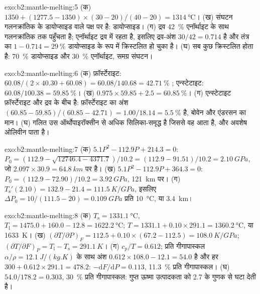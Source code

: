 \begin{solution}{exo:b2:mantle-melting:5}
(क) $1350 + (1277.5 - 1350)\times(30 - 20)/(40 - 20) = \qty{1314}{\celsius}$।
(ख) संघटन गलनक्रांतिक के डायोप्साइड वाले पक्ष पर है: डायोप्साइड।
(ग) द्रव \qty{42}{\percent} एनॉर्थाइट के साथ गलनक्रांतिक तक पहुँचता है; एनॉर्थाइट
द्रव में रहता है, इसलिए द्रव-अंश $30/42 = 0.714$ है और तंत्र का $1 - 0.714 =
\qty{29}{\percent}$ डायोप्साइड के रूप में क्रिस्टलित हो चुका है। (घ) सब कुछ
क्रिस्टलित होता है: \qty{70}{\percent} डायोप्साइड और \qty{30}{\percent} एनॉर्थाइट,
समग्र संघटन।
\end{solution}

\begin{solution}{exo:b2:mantle-melting:6}
(क) फ़ॉर्स्टेराइट: $60.08/(2\times40.30 + 60.08) = 60.08/140.68 =
\qty{42.71}{\percent}$ ; एन्स्टेटाइट: $60.08/100.38 = \qty{59.85}{\percent}$।
(ख) $0.975\times59.85 + 2.5 = \qty{60.85}{\percent}$। (ग) एन्स्टेटाइट फ़ॉर्स्टेराइट
और द्रव के बीच है: फ़ॉर्स्टेराइट का अंश $(60.85 - 59.85)/(60.85 -
42.71) = 1.00/18.14 = \qty{5.5}{\percent}$ है, बोवेन और एंडरसन का मान। (घ)
गलित उस ऑर्थोपाइरॉक्सीन से अधिक सिलिका-समृद्ध है जिससे वह आता है, और अवशेष
ओलिवीन पाता है।
\end{solution}

\begin{solution}{exo:b2:mantle-melting:7}
(क) $5.1P^2 - 112.9P + 214.3 = 0$: $P_0 = (112.9 - \sqrt{12746.4 -
4371.7})/10.2 = (112.9 - 91.51)/10.2 = \qty{2.10}{GPa}$, जो $2.097\times30.9 =
\qty{64.8}{km}$ पर है। (ख) $5.1P^2 - 112.9P + 364.3 = 0$: $P_0 = (112.9 -
72.90)/10.2 = \qty{3.92}{GPa}$, \qty{121}{km} पर। (ग) $T_{\mathrm s}'(2.10) = 132.9
- 21.4 = \qty{111.5}{K/GPa}$, इसलिए $\Delta P_0 = 10/(111.5 - 20) = \qty{0.109}{GPa}$
प्रति \qty{10}{\celsius}, या \qty{3.4}{km}।
\end{solution}

\begin{solution}{exo:b2:mantle-melting:8}
(क) $T_{\mathrm s} = \qty{1331.1}{\celsius}$, $T_{\mathrm l} = 1475.0 + 160.0 -
12.8 = \qty{1622.2}{\celsius}$; $T = 1331.1 + 0.10\times291.1 =
\qty{1360.2}{\celsius}$, या \qty{1633}{K}। (ख) $(\partial T/\partial P)_F = 112.5
+ 0.10\times(67.2 - 112.5) = \qty{108.0}{K/GPa}$; $(\partial T/\partial F)_P =
T_{\mathrm l} - T_{\mathrm s} = \qty{291.1}{K}$। (ग) $c_p/T = 0.612$; प्रति गीगापास्कल $\alpha/\rho
= \qty{12.1}{J/(kg.K)}$ के साथ अंश $0.612\times108.0 - 12.1
= 54.0$ है और हर $300 + 0.612\times291.1 = 478.2$: $-\mathrm dF/\mathrm
dP = 0.113$, \qty{11.3}{\percent} प्रति गीगापास्कल। (घ) $54.0/178.2 = 0.303$,
\qty{30}{\percent} प्रति गीगापास्कल: गुप्त ऊष्मा उत्पादकता को 2.7 के
गुणक से घटा देती है।
\end{solution}

